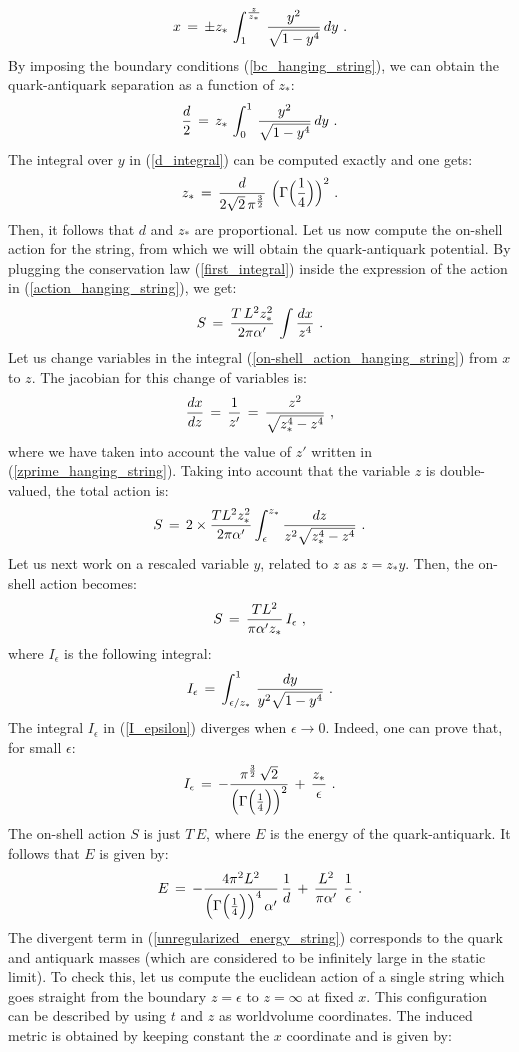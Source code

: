 \documentclass[12pt,notitlepage,a4paper]{article}
\newcommand{\beq}{\begin{equation}}
\newcommand{\eeq}{\end{equation}}
\begin{document}
\beq
x\,=\,\pm z_*\,\int_{1}^{{z\over z_*}}\,
{y^2\over \sqrt{1-y^4}}\,dy\,\,.
\eeq
By imposing the boundary conditions (\ref{bc_hanging_string}), we can obtain the quark-antiquark separation as a function of $z_*$:
\beq
{d\over 2}\,=\,z_*\,\int_{0}^{1}\,{y^2\over \sqrt{1-y^4}}\,dy\,\,.
\label{d_integral}
\eeq
The integral over $y$ in (\ref{d_integral}) can be computed exactly and one gets:
\beq
z_*\,=\,{d\over  2\sqrt{2}\,\pi^{{3\over 2}}}\,\,
\Big(\Gamma\Big({1\over 4}\Big)\Big)^2\,\,.
\eeq
Then, it follows that $d$ and $z_*$ are proportional.  Let us now compute the on-shell action for the string, from which we will obtain the quark-antiquark potential. By plugging the conservation law (\ref{first_integral}) inside the expression  of the action in (\ref{action_hanging_string}), we get:
\beq
S\,=\,{T\,L^2 z_*^2\over 2\pi\alpha'}\,\int {dx\over z^4}\,\,.
\label{on-shell_action_hanging_string}
\eeq
Let us change variables in the integral  (\ref{on-shell_action_hanging_string}) from $x$ to $z$. The jacobian for this change of variables  is:
\beq
{dx\over dz}\,=\,{1\over z'}\,=\,{z^2\over \sqrt{z_*^4-z^4}}\,\,,
\eeq
where we have taken into account the value of $z'$ written in (\ref{zprime_hanging_string}). Taking into account that the variable $z$ is double-valued, the total action is:
\beq
S\,=\,2\times {T L^2 z_*^2\over 2\pi\alpha'} \int_{\epsilon}^{z_*}
{dz\over z^2\sqrt{z_*^4-z^4}}\,\,.
\eeq
Let us next work on a rescaled variable $y$, related to $z$ as $z=z_* y$. Then, the on-shell action becomes:
\beq
S\,=\,{T L^2 \over \pi\alpha'z_*}\,I_{\epsilon}\,\,,
\eeq
where $I_{\epsilon}$ is the following integral:
\beq
I_{\epsilon}\,=\,\int_{\epsilon/z_*}^{1}\,
{dy\over y^2\sqrt{1-y^4}}\,\,.
\label{I_epsilon}
\eeq
The integral $I_{\epsilon}$ in (\ref{I_epsilon})  diverges when $\epsilon\to 0$. Indeed, one can prove that, for small $\epsilon$:
\beq
I_{\epsilon}\,=\,-{\pi^{{3\over 2}}\,\sqrt{2}\over \Big(\Gamma\Big({1\over 4}\Big)\Big)^2}\,+\,{z_*\over \epsilon}\,\,.
\eeq
The  on-shell action $S$ is just $T\,E$, where $E$ is the energy of the quark-antiquark. It follows that $E$ is given by:
\beq
E\,=\,-{4\pi^2 L^2\over \Big(\Gamma\Big({1\over 4}\Big)\Big)^4\,\alpha'}\,{1\over d}\,+\,
{L^2\over \pi\alpha'}\,\,{1\over \epsilon}\,\,.
\label{unregularized_energy_string}
\eeq
The divergent term  in (\ref{unregularized_energy_string}) corresponds to the quark  and antiquark masses (which are considered to be infinitely large in the static limit). To check this, let us compute the euclidean action of a single string which goes straight  from the boundary $z=\epsilon$ to $z=\infty$ at fixed $x$. This configuration can be described by using $t$ and $z$ as worldvolume coordinates. The induced metric is obtained by keeping constant the $x$ coordinate and is given by:
\end{document}
